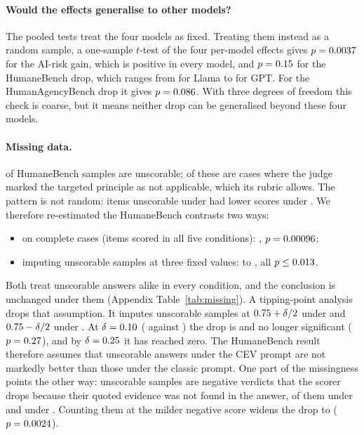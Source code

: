 \paragraph{Would the effects generalise to other models?}
The pooled tests treat the four models as fixed. Treating them instead as a random sample, a one-sample $t$-test of
the four per-model effects gives $p=0.0037$ for the AI-risk gain, which is positive in
every model, and $p=0.15$ for the HumaneBench drop, which ranges from
\RHbCevClassicLlamaDiff{} for Llama to \RHbCevClassicGptDiff{} for GPT. For the HumanAgencyBench drop it gives
$p=0.086$. With three degrees of freedom this check is coarse, but it means neither drop
can be generalised beyond these four models.

\paragraph{Missing data.}
\RHbUnscorableShare{} of HumaneBench samples are unscorable; \RHbNotApplicableN{} of these \RHbUnscorableN{} are
cases where the judge marked the targeted principle as not applicable, which its rubric allows. The pattern is not random: items unscorable under  had lower scores under
. We therefore re-estimated the HumaneBench contrasts two ways:
\begin{itemize}
  \item on complete cases (items scored in all five conditions): \RHbMissCompleteCevClassicDiff{},
  $p=0.00096$;
  \item imputing unscorable samples at three fixed values: \RHbMissImputeCevClassicMin{} to
  \RHbMissImputeCevClassicMax{}, all $p\le0.013$.
\end{itemize}
Both treat unscorable answers alike in every condition, and the conclusion is unchanged under them (Appendix
Table~\ref{tab:missing}). A tipping-point analysis drops that assumption. It imputes unscorable samples at
$0.75+\delta/2$ under  and $0.75-\delta/2$ under . At $\delta=0.10$ (\RHbTipNsFillA{}
against \RHbTipNsFillB{}) the drop is \RHbTipNsDiff{} and no longer significant ($p=0.27$), and by
$\delta=0.25$ it has reached zero. The HumaneBench result therefore assumes that unscorable answers under the CEV
prompt are not markedly better than those under the classic prompt. One part of the missingness points the other way:
\RHbUnverifiedN{} unscorable samples are negative verdicts that the scorer drops because their quoted evidence was not
found in the answer, \RHbUnverifiedCev{} of them under  and \RHbUnverifiedClassic{} under .
Counting them at the milder negative score widens the drop to \RHbMissUnverifiedCevClassicDiff{}
($p=0.0024$).

